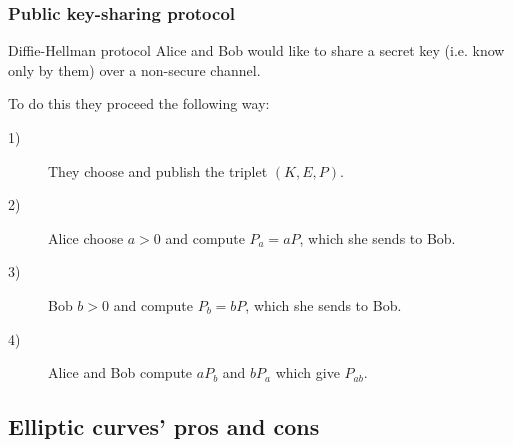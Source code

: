 \begin{frame}[t]
    \frametitle{Public key-sharing protocol}
    \begin{exampleblock}{Diffie-Hellman protocol}
        Alice and Bob would like to share a secret key (i.e. know only by them) over a non-secure channel.

        To do this they proceed the following way:
        \begin{description}
            \item[1)] 
                They choose and publish the triplet $\left( K,E,P \right) $.

            \item[2)] Alice choose $a>0$ and compute $P_{a} =
                aP$, which she sends to Bob.

            \item[3)] Bob $b>0$ and compute $P_{b} =
                bP$, which she sends to Bob.
                \item[4)] Alice and Bob compute $aP_{b}$ and $bP_{a}$ which give $P_{ab}$.
        \end{description}
    \end{exampleblock}
\end{frame}

\subsection{Elliptic curves' pros and cons}

